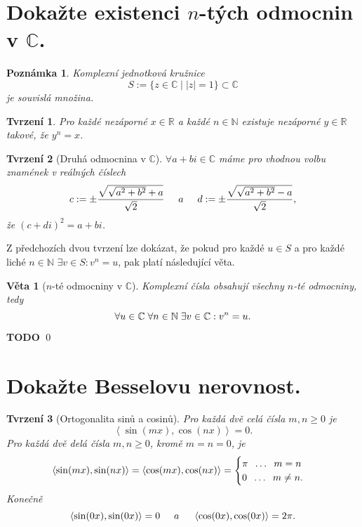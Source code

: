 \documentclass[11pt]{article}
\theoremstyle{nontheoremstyle}
\renewenvironment{proof}{{\noindent\bfseries Důkaz:}}{\qed}
\newtheorem*{remark}{Poznámka}
\theoremstyle{nontheoremstylenodot}
\theoremstyle{theoremstyle}
\newtheorem*{theorem}{Věta}
\newtheorem*{lemma}{Tvrzení}
\begin{document}
\section{Dokažte existenci $n$-tých odmocnin v $\mathbb{C}$.}

\begin{remark}
    Komplexní jednotková kružnice \[ S := \{ z \in \mathbb{C} \mid |z| = 1 \} \subset \mathbb{C} \]
    je souvislá množina.
\end{remark}

\begin{lemma}
    Pro každé nezáporné $x \in \mathbb{R}$ a každé $n \in \mathbb{N}$ existuje nezáporné $y\in \mathbb{R}$ takové, že $y^n = x$.
\end{lemma}

\begin{lemma}[Druhá odmocnina v $\mathbb{C}$]
    $\forall a+bi \in \mathbb{C}$ máme pro vhodnou volbu znamének v reálných číslech
    \[ c := \pm \frac{\sqrt{\sqrt{a^2 + b^2} + a}}{\sqrt{2}} \hspace{5mm} a \hspace{5mm} d := \pm \frac{\sqrt{\sqrt{a^2 + b^2} - a}}{\sqrt{2}}, \]
    že $(c+di)^2 = a+bi$.
\end{lemma}

Z předchozích dvou tvrzení lze dokázat, že pokud pro každé $u \in S$ a pro každé liché $ n \in\mathbb{N}$ $\exists v \in S: v^n = u$, pak
platí následující věta.

\begin{theorem}[$n$-té odmocniny v $\mathbb{C}$]
    Komplexní čísla obsahují všechny $n$-té odmocniny, tedy
    \[ \forall u \in \mathbb{C} \hspace{1mm} \forall n \in \mathbb{N} \hspace{1mm} \exists v \in \mathbb{C}: v^n = u. \]
\end{theorem}
\begin{proof}
    \LARGE
    \textbf{TODO}
\end{proof}

\section{Dokažte Besselovu nerovnost.}

\begin{lemma}[Ortogonalita sinů a cosinů]
    Pro každá dvě celá čísla $m,n\geq 0$ je \[ \left< \sin(mx),\cos(nx) \right> = 0. \]
    Pro každá dvě delá čísla $m,n\geq 0$, kromě $m=n=0$, je
    \[ \left< \sin(mx), \sin(nx) \right> = \left< \cos(mx), \cos(nx) \right> =
    \begin{cases} \pi \hspace{2mm} \dots \hspace{2mm} m=n\\ 0 \hspace{2mm} \dots \hspace{2mm} m\neq n. \end{cases} \]
    Konečně
    \[ \left< \sin(0x), \sin(0x) \right> = 0 \hspace{5mm} a \hspace{5mm} \left< \cos(0x), \cos(0x) \right> = 2\pi. \]
\end{lemma}
\end{document}
